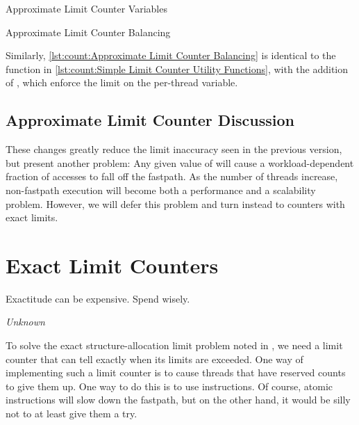 \begin{listing}

\caption{Approximate Limit Counter Variables}
\label{lst:count:Approximate Limit Counter Variables}
\end{listing}

\begin{listing}

\caption{Approximate Limit Counter Balancing}
\label{lst:count:Approximate Limit Counter Balancing}
\end{listing}

\begin{fcvref}
Similarly,
\cref{lst:count:Approximate Limit Counter Balancing}
is identical to the  function in
\cref{lst:count:Simple Limit Counter Utility Functions},
with the addition of
, which enforce the
 limit on the per-thread  variable.
\end{fcvref}

\subsection{Approximate Limit Counter Discussion}

These changes greatly reduce the limit inaccuracy seen in the previous version,
but present another problem:
Any given value of  will cause a workload-dependent
fraction of accesses to fall off the fastpath.
As the number of threads increase, non-fastpath execution will become both
a performance and a scalability problem.
However, we will defer this problem and turn instead to counters
with exact limits.

\section{Exact Limit Counters}
\label{sec:count:Exact Limit Counters}
%
\epigraph{Exactitude can be expensive.
	  Spend wisely.}{\emph{Unknown}}

To solve the exact structure-allocation limit problem noted in
\QuickQuizRef{\QcountQexactcnt},
we need a limit counter that can tell exactly when its limits are
exceeded.
One way of implementing such a limit counter is to
cause threads that have reserved counts to give them up.
One way to do this is to use  instructions.
Of course, atomic instructions will slow down the fastpath, but on the
other hand, it would be silly not to at least give them a try.

